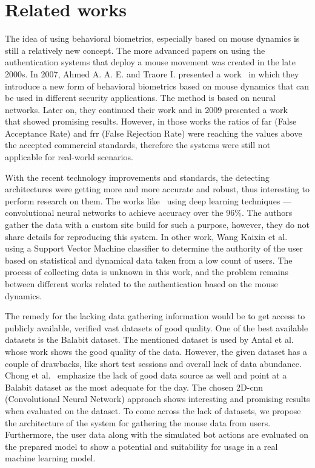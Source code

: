 \section{Related works}\label{sec:related-works}
The idea of using behavioral biometrics, especially based on mouse dynamics is still a relatively new concept.
The more advanced papers on using the authentication systems that deploy a mouse movement was created in the late 2000s.
In 2007, Ahmed A. A. E. and Traore I. presented a work~\cite{firstMouseBBPapers1} in which they introduce a new form of behavioral biometrics based on mouse dynamics that can be used in different security applications.
The method is based on neural networks.
Later on, they continued their work and in 2009 presented a work~\cite{wang2009behavioral} that showed promising results.
However, in those works the ratios of \gls{far} (False Acceptance Rate) and \gls{frr} (False Rejection Rate) were reaching the values above the accepted commercial standards, therefore the systems were still not applicable for real-world scenarios.

With the recent technology improvements and standards, the detecting architectures were getting more and more accurate and robust, thus interesting to perform research on them.
The works like~\cite{a-deep-learning-approach-to-web-bot-detection-using-mouse-behavioral-biometrics} using deep learning techniques --- convolutional neural networks to achieve accuracy over the 96\%.
The authors gather the data with a custom site build for such a purpose, however, they do not share details for reproducing this system.
In other work, Wang Kaixin et al.~\cite{a-user-authentication-and-identification-model-based-on-mouse-dynamics} using a Support Vector Machine classifier to determine the authority of the user based on statistical and dynamical data taken from a low count of users.
The process of collecting data is unknown in this work, and the problem remains between different works related to the authentication based on the mouse dynamics.

The remedy for the lacking data gathering information would be to get access to publicly available, verified vast datasets of good quality.
One of the best available datasets is the Balabit dataset.
The mentioned dataset is used by Antal et al.~\cite{antal2019intrusion} whose work shows the good quality of the data.
However, the given dataset has a couple of drawbacks, like short test sessions and overall lack of data abundance.
Chong et al.~\cite{Main} emphasize the lack of good data source as well and point at a Balabit dataset as the most adequate for the day.
The chosen 2D-\gls{cnn} (Convolutional Neural Network) approach shows interesting and promising results when evaluated on the dataset.
To come across the lack of datasets, we propose the architecture of the system for gathering the mouse data from users.
Furthermore, the user data along with the simulated bot actions are evaluated on the prepared model to show a potential and suitability for usage in a real machine learning model.
